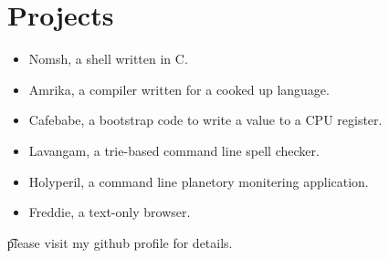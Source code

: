 \documentclass{article}
\begin{document}
\section*{Projects}
\begin{itemize}
\item Nomsh, a shell written in C.
\item Amrika, a compiler written for a cooked up language.
\item Cafebabe, a bootstrap code to write a value to a CPU register.
\item Lavangam, a trie-based command line spell checker.
\item Holyperil, a command line planetory monitering application. 
\item Freddie, a text-only browser.
\end{itemize}
\t please visit my github profile for details. 
\end{document}
